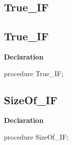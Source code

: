 \documentclass{report}
\newif\ifpdf
\begin{document}
\subsection*{\large{\textbf{True{\_}IF}}\normalsize\hspace{1ex}\hrulefill}
\else
\subsection*{True{\_}IF}
\fi
\label{ok_if_expressions-True_IF}
\begin{list}{}{
\setlength{\itemindent}{0cm}
\setlength{\listparindent}{0cm}
\setlength{\leftmargin}{\evensidemargin}
\addtolength{\leftmargin}{\tmplength}
\settowidth{\labelsep}{X}
\addtolength{\leftmargin}{\labelsep}
\setlength{\labelwidth}{\tmplength}
}
\item[\textbf{Declaration}\hfill]
\ifpdf
\begin{flushleft}
\fi
\begin{ttfamily}
procedure True{\_}IF;\end{ttfamily}

\ifpdf
\end{flushleft}
\fi

\end{list}
\ifpdf
\subsection*{\large{\textbf{SizeOf{\_}IF}}\normalsize\hspace{1ex}\hrulefill}
\else
\subsection*{SizeOf{\_}IF}
\fi
\label{ok_if_expressions-SizeOf_IF}
\begin{list}{}{
\setlength{\itemindent}{0cm}
\setlength{\listparindent}{0cm}
\setlength{\leftmargin}{\evensidemargin}
\addtolength{\leftmargin}{\tmplength}
\settowidth{\labelsep}{X}
\addtolength{\leftmargin}{\labelsep}
\setlength{\labelwidth}{\tmplength}
}
\item[\textbf{Declaration}\hfill]
\ifpdf
\begin{flushleft}
\fi
\begin{ttfamily}
procedure SizeOf{\_}IF;\end{ttfamily}

\ifpdf
\end{flushleft}
\fi

\end{list}
\ifpdf
\end{document}
